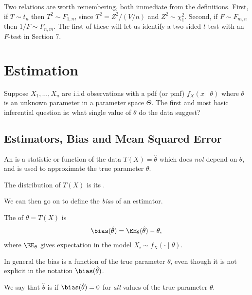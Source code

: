 Two relations are worth remembering, both immediate from the definitions. First, if $T \sim t_n$ then $T^2 \sim F_{1,n}$, since $T^2 = Z^2/(V/n)$ and $Z^2 \sim \chi^2_1$. Second, if $F \sim F_{m,n}$ then $1/F \sim F_{n,m}$. The first of these will let us identify a two-sided $t$-test with an $F$-test in Section 7.


\section{Estimation}

Suppose $X_1, \dots, X_n$ are i.i.d observations with a pdf (or pmf)
$
f_X(x \mid \theta)
$
where $\theta$ is an unknown parameter in a parameter space $\Theta$. The first and most basic inferential question is: what single value of $\theta$ do the data suggest?

\subsection{Estimators, Bias and Mean Squared Error}

\begin{definition}[Estimator]
An  is a statistic or function of the data $T(X) = \hat{\theta}$ which does \emph{not} depend on $\theta$, and is used to approximate the true parameter $\theta$.
\end{definition}


The distribution of $T(X)$ is its .

We can then go on to define the \emph{bias} of an estimator.

\begin{definition}[Bias]
  The  of $\hat{\theta} = T(X)$ is
  $$
  \bias(\hat{\theta}) = \EE_{\theta} (\hat{\theta}) - \theta,
  $$
  where $\EE_\theta$ gives expectation in the model $X_i \sim f_X(\cdot \mid \theta)$.
\end{definition}

\begin{remark}
  In general the bias is a function of the true parameter $\theta$, even though it is not explicit in the notation $\bias(\hat{\theta})$.
\end{remark}

\begin{definition}
  We say that $\hat{\theta}$ is  if $\bias(\hat{\theta}) = 0$ for \emph{all} values of the true parameter $\theta$.
\end{definition}

